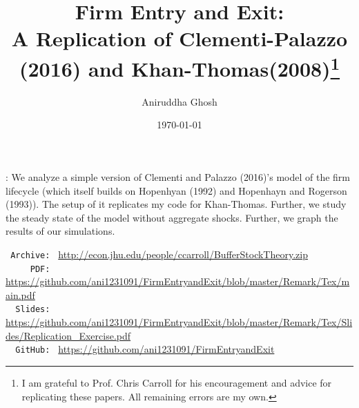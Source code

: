\documentclass[]{article}
\newcommand{\fn}{\footnote}
\begin{document}
\begin{titlepage}
\def\thefootnote{\fnsymbol{footnote}}
\vspace*{1.1in}
\title{Firm Entry and Exit: \\   \vspace{0.5em}
A Replication of Clementi-Palazzo (2016) and Khan-Thomas(2008)\fn{I am grateful to Prof. Chris Carroll for his encouragement and advice for replicating these papers. All remaining errors are my own.}}
\author{Aniruddha Ghosh}
\date{\today}

\end{titlepage}

\linespread{2}
\maketitle


: We analyze a simple version of Clementi and Palazzo (2016)’s \cite{cp16} model of the firm lifecycle (which
itself builds on Hopenhyan (1992) and Hopenhayn and Rogerson (1993)). The setup of it
replicates my code for Khan-Thomas. Further, we study the steady state of the model without aggregate
shocks. Further, we graph the results of our simulations.
    \hspace*{2.0em} 



\begin{small}
\parbox{\textwidth}{
\begin{center}
\begin{tabbing}
\texttt{~Archive:~} \= \= \url{http://econ.jhu.edu/people/ccarroll/BufferStockTheory.zip} \kill \\  %
\texttt{~~~~~PDF:~} \> \> \url{https://github.com/ani1231091/FirmEntryandExit/blob/master/Remark/Tex/main.pdf} \\
\texttt{~~Slides:~} \> \> \url{https://github.com/ani1231091/FirmEntryandExit/blob/master/Remark/Tex/Slides/Replication_Exercise.pdf} \\
\texttt{~~GitHub:~} \> \> \url{https://github.com/ani1231091/FirmEntryandExit} \\
\end{tabbing}
\end{center}
          }
\end{small}
\newpage
\end{document}
